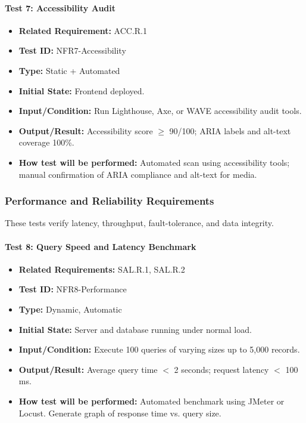 \documentclass[12pt, titlepage]{article}
\begin{document}
\paragraph{Test 7: Accessibility Audit}
\begin{itemize}
    \item \textbf{Related Requirement:} ACC.R.1
    \item \textbf{Test ID:} NFR7-Accessibility
    \item \textbf{Type:} Static + Automated
    \item \textbf{Initial State:} Frontend deployed.
    \item \textbf{Input/Condition:} Run Lighthouse, Axe, or WAVE accessibility audit tools.
    \item \textbf{Output/Result:} Accessibility score $\geq$ 90/100; ARIA labels and alt-text coverage 100\%.
    \item \textbf{How test will be performed:} Automated scan using accessibility tools; manual confirmation of ARIA compliance and alt-text for media.
\end{itemize}

\subsubsection{Performance and Reliability Requirements}

These tests verify latency, throughput, fault-tolerance, and data integrity.

\paragraph{Test 8: Query Speed and Latency Benchmark}
\begin{itemize}
    \item \textbf{Related Requirements:} SAL.R.1, SAL.R.2
    \item \textbf{Test ID:} NFR8-Performance
    \item \textbf{Type:} Dynamic, Automatic
    \item \textbf{Initial State:} Server and database running under normal load.
    \item \textbf{Input/Condition:} Execute 100 queries of varying sizes up to 5,000 records.
    \item \textbf{Output/Result:} Average query time $<$ 2 seconds; request latency $<$ 100 ms.
    \item \textbf{How test will be performed:} Automated benchmark using JMeter or Locust. Generate graph of response time vs. query size.
\end{itemize}
\end{document}
